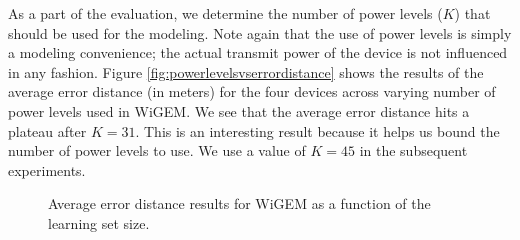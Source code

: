 

As a part of the evaluation, we determine the number of power levels ($K$) that should 
be used for the modeling. Note again that the use of power levels is simply a modeling convenience; the 
actual transmit power of the device is not influenced in any fashion. Figure \ref{fig:powerlevelsvserrordistance} shows the results of the average error distance (in meters) for the four devices across  varying number of power levels used in WiGEM. We see that the average error distance hits a plateau after $K = 31$. This is an interesting result because it helps us bound the number of power levels to use. We use a value of $K = 45$ in the subsequent experiments. 

%
\begin{figure}[h!]
\centering
  \caption{Average error distance results for WiGEM
   as a function of the learning set size.}
  \label{fig:learningsetsizevserrordistance}
\end{figure}

